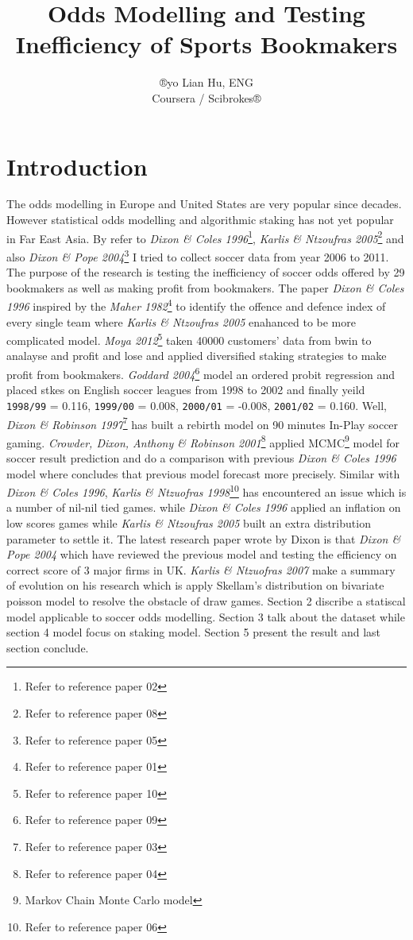 \documentclass[article]{jss}
\author{
®yo Lian Hu, ENG\\Coursera / Scibrokes®
}
\title{Odds Modelling and Testing Inefficiency of Sports Bookmakers
\pkg{Rmodel}}
\begin{document}
\section{Introduction}\label{introduction}

The odds modelling in Europe and United States are very popular since
decades. However statistical odds modelling and algorithmic staking has
not yet popular in Far East Asia. \bigbreak
  By refer to \emph{Dixon \& Coles 1996}\footnote{Refer to reference
  paper 02}, \emph{Karlis \& Ntzoufras 2005}\footnote{Refer to reference
  paper 08} and also \emph{Dixon \& Pope 2004}\footnote{Refer to
  reference paper 05} I tried to collect soccer data from year 2006 to
2011. The purpose of the research is testing the inefficiency of soccer
odds offered by 29 bookmakers as well as making profit from bookmakers.
\bigbreak
  The paper \emph{Dixon \& Coles 1996} inspired by the \emph{Maher
1982}\footnote{Refer to reference paper 01} to identify the offence and
defence index of every single team where \emph{Karlis \& Ntzoufras 2005}
enahanced to be more complicated model. \emph{Moya 2012}\footnote{Refer
  to reference paper 10} taken 40000 customers' data from bwin to
analayse and profit and lose and applied diversified staking strategies
to make profit from bookmakers. \emph{Goddard 2004}\footnote{Refer to
  reference paper 09} model an ordered probit regression and placed
stkes on English soccer leagues from 1998 to 2002 and finally yeild
\texttt{1998/99} = 0.116, \texttt{1999/00} = 0.008, \texttt{2000/01} =
-0.008, \texttt{2001/02} = 0.160. \bigbreak
  Well, \emph{Dixon \& Robinson 1997}\footnote{Refer to reference paper
  03} has built a rebirth model on 90 minutes In-Play soccer gaming.
\emph{Crowder, Dixon, Anthony \& Robinson 2001}\footnote{Refer to
  reference paper 04} applied MCMC\footnote{Markov Chain Monte Carlo
  model} model for soccer result prediction and do a comparison with
previous \emph{Dixon \& Coles 1996} model where concludes that previous
model forecast more precisely. \bigbreak
  Similar with \emph{Dixon \& Coles 1996}, \emph{Karlis \& Ntzuofras
1998}\footnote{Refer to reference paper 06} has encountered an issue
which is a number of nil-nil tied games. while \emph{Dixon \& Coles
1996} applied an inflation on low scores games while \emph{Karlis \&
Ntzoufras 2005} built an extra distribution parameter to settle it.
\bigbreak
  The latest research paper wrote by Dixon is that \emph{Dixon \& Pope
2004} which have reviewed the previous model and testing the efficiency
on correct score of 3 major firms in UK. \emph{Karlis \& Ntzuofras 2007}
make a summary of evolution on his research which is apply Skellam's
distribution on bivariate poisson model to resolve the obstacle of draw
games. \bigbreak
  Section 2 discribe a statiscal model applicable to soccer odds
modelling. Section 3 talk about the dataset while section 4 model focus
on staking model. Section 5 present the result and last section
conclude.
\end{document}
